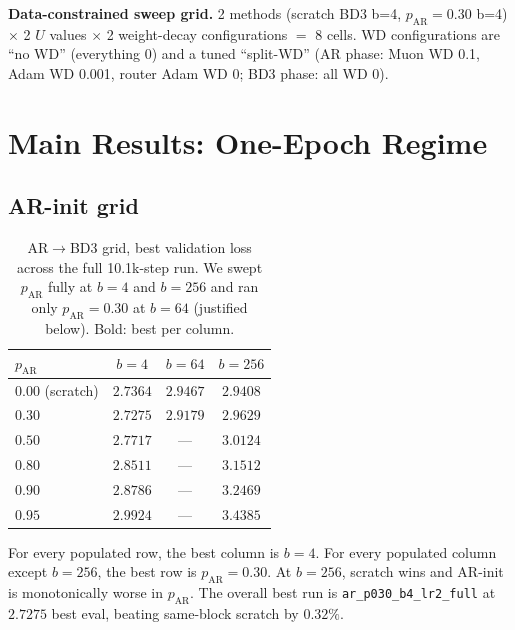 \documentclass{article}
\newcommand{\pAR}{p_{\mathrm{AR}}}
\begin{document}
\textbf{Data-constrained sweep grid.} 2 methods (scratch BD3 b=4, $\pAR{=}0.30$ b=4) $\times$ 2 $U$ values $\times$ 2 weight-decay configurations $=$ 8 cells. WD configurations are ``no WD'' (everything 0) and a tuned ``split-WD'' (AR phase: Muon WD 0.1, Adam WD 0.001, router Adam WD 0; BD3 phase: all WD 0).

\section{Main Results: One-Epoch Regime}
\label{sec:main_one_epoch}

\subsection{AR-init grid}

\begin{table}[h]
\centering
\caption{AR$\to$BD3 grid, best validation loss across the full 10.1k-step run. We swept $\pAR$ fully at $b{=}4$ and $b{=}256$ and ran only $\pAR{=}0.30$ at $b{=}64$ (justified below). Bold: best per column.}
\label{tab:ar_init}
\small
\begin{tabular}{lccc}
\toprule
$\pAR$ & $b{=}4$ & $b{=}64$ & $b{=}256$ \\
\midrule
$0.00$ (scratch) & $2.7364$         & $2.9467$                  & $\mathbf{2.9408}$ \\
$0.30$           & $\mathbf{2.7275}$ & $\mathbf{2.9179}$ & $2.9629$ \\
$0.50$           & $2.7717$ & ---                       & $3.0124$ \\
$0.80$           & $2.8511$ & ---                       & $3.1512$ \\
$0.90$           & $2.8786$ & ---                       & $3.2469$ \\
$0.95$           & $2.9924$ & ---                       & $3.4385$ \\
\bottomrule
\end{tabular}
\end{table}

For every populated row, the best column is $b{=}4$. For every populated column except $b{=}256$, the best row is $\pAR{=}0.30$. At $b{=}256$, scratch wins and AR-init is monotonically worse in $\pAR$. The overall best run is \texttt{ar\_p030\_b4\_lr2\_full} at $2.7275$ best eval, beating same-block scratch by $0.32\%$.
\end{document}
